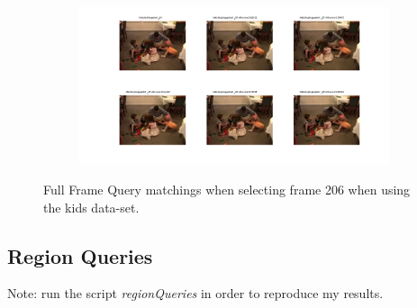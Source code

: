 \documentclass{paper}
\begin{document}
\begin{figure}[H]
\centering
\begin{subfigure}{1.0\textwidth}
\includegraphics[width=\textwidth]{figures/full_frame_queries/kids/fullQueries206}
\end{subfigure}
\caption{Full Frame Query matchings when selecting frame 206 when using the kids data-set.}
\label{fig:kids_fullquery_2}
\end{figure}

















\subsection{Region Queries}
Note: run the script \emph{regionQueries} in order to reproduce my results. \\
\end{document}
